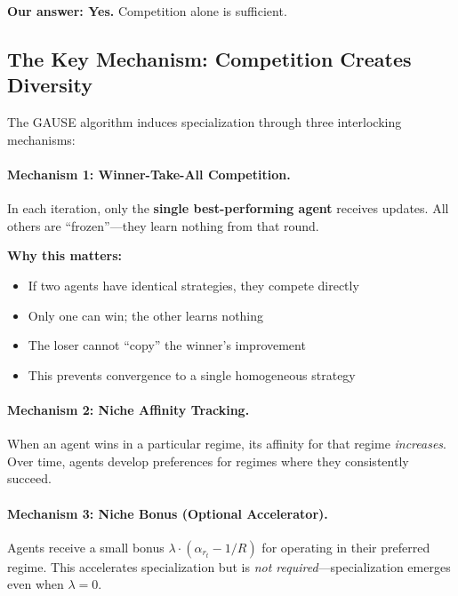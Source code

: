\textbf{Our answer: Yes.} Competition alone is sufficient.


\subsection{The Key Mechanism: Competition Creates Diversity}

The GAUSE algorithm induces specialization through three interlocking mechanisms:

\paragraph{Mechanism 1: Winner-Take-All Competition.}

In each iteration, only the \textbf{single best-performing agent} receives updates. All others are ``frozen''---they learn nothing from that round.

\textbf{Why this matters:}
\begin{itemize}
    \item If two agents have identical strategies, they compete directly
    \item Only one can win; the other learns nothing
    \item The loser cannot ``copy'' the winner's improvement
    \item This prevents convergence to a single homogeneous strategy
\end{itemize}

\paragraph{Mechanism 2: Niche Affinity Tracking.}

When an agent wins in a particular regime, its affinity for that regime \textit{increases}. Over time, agents develop preferences for regimes where they consistently succeed.

\paragraph{Mechanism 3: Niche Bonus (Optional Accelerator).}

Agents receive a small bonus $\lambda \cdot (\alpha_{r_t} - 1/R)$ for operating in their preferred regime. This accelerates specialization but is \textit{not required}---specialization emerges even when $\lambda = 0$.

